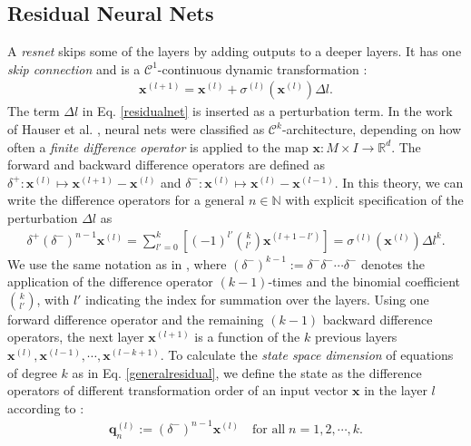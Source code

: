 \documentclass[envcountsect,runningheads]{llncs}
\begin{document}
\subsection{Residual Neural Nets}
\label{resnet}
A \textit{resnet} skips some of the layers by adding outputs to a deeper layers. It has one \textit{skip connection} and is a $\mathcal{C}^1$-continuous dynamic transformation :
\begin{align}
	\label{residualnet}
	\textbf{x}^{(l+1)} = \textbf{x}^{(l)} + \sigma^{(l)}\left(\textbf{x}^{(l)}\right) \Delta l.
\end{align}
The term $\Delta l$ in Eq. \ref{residualnet} is inserted as a perturbation term. In the work of Hauser et al. , neural nets were classified as $\mathcal{C}^k$-architecture, depending on how often a \textit{finite difference operator} is applied to the map $\textbf{x}: M \times I \rightarrow \mathbb{R}^d$. The forward and backward difference operators are defined as $\delta^{+}: \textbf{x}^{(l)} \mapsto \textbf{x}^{(l+1)} - \textbf{x}^{(l)}$ and $\delta^{-}: \textbf{x}^{(l)} \mapsto \textbf{x}^{(l)} - \textbf{x}^{(l-1)}$. In this theory, we can write the difference operators for a general $n \in \mathbb{N}$ with explicit specification of the perturbation $\Delta l$ as
\begin{align}
	\label{generalresidual}
	\delta^+\left( \delta^- \right)^{n-1} \textbf{x}^{(l)} = \sum_{l'=0}^{k} \left[ (-1)^{l'} {k \choose l'} \textbf{x}^{(l+1-l')} \right] = \sigma^{(l)} \left(\textbf{x}^{(l)}\right) \Delta l^k.
\end{align}
We use the same notation as in , where $(\delta^-)^{k-1} := \delta^- \delta^- \cdots \delta^-$ denotes the application of the difference operator $(k-1)$-times and the binomial coefficient ${k \choose l'}$, with $l'$ indicating the index for summation over the layers. Using one forward difference operator and the remaining $(k-1)$ backward difference operators, the next layer $\textbf{x}^{(l+1)}$ is a function of the $k$ previous layers $\textbf{x}^{(l)}, \textbf{x}^{(l-1)}, \cdots, \textbf{x}^{(l-k+1)}$. To calculate the \textit{state space dimension} of equations of degree $k$ as in Eq. \ref{generalresidual}, we define the state as the difference operators of different transformation order of an input vector $\textbf{x}$ in the layer $l$ according to :
\begin{align}
	\textbf{q}_n^{(l)} := \left( \delta^- \right)^{n-1} \textbf{x}^{(l)} \quad \text{for all} \; n = 1,2,\cdots,k.
\end{align}
\end{document}
